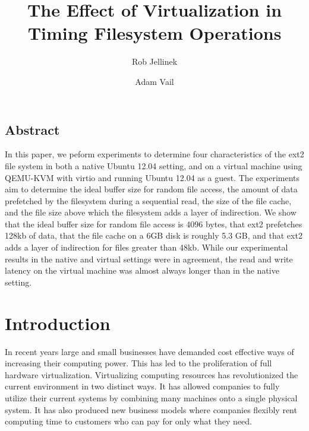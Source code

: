 \documentclass[letterpaper,twocolumn,10pt]{article}
\begin{document}
\date{}

\title{\Large \bf The Effect of Virtualization in Timing Filesystem Operations}

\author{
{\rm Rob Jellinek}\\
\and
{\rm Adam Vail}\\
} %

\maketitle

\thispagestyle{empty}

\subsection*{Abstract}
In this paper, we peform experiments to determine four characteristics of the ext2 file system in both a native Ubuntu 12.04 setting, and on a virtual machine using QEMU-KVM with virtio and running Ubuntu 12.04 as a guest. The experiments aim to determine the ideal buffer size for random file access, the amount of data prefetched by the filesystem during a sequential read, the size of the file cache, and the file size above which the filesystem adds a layer of indirection. We show that the ideal buffer size for random file access is 4096 bytes, that ext2 prefetches 128kb of data, that the file cache on a 6GB disk is roughly 5.3 GB, and that ext2 adds a layer of indirection for files greater than 48kb. While our experimental results in the native and virtual settings were in agreement, the read and write latency on the virtual machine was almost always longer than in the native setting.

\section{Introduction}

In recent years large and small businesses have demanded cost effective ways of increasing their computing power.
This has led to the proliferation of full hardware virtualization.
Virtualizing computing resources has revolutionized the current environment in two distinct ways.
It has allowed companies to fully utilize their current systems by combining many machines onto a single physical system.
It has also produced new business models where companies flexibly rent computing time to customers who can pay for only what they need.
\end{document}
